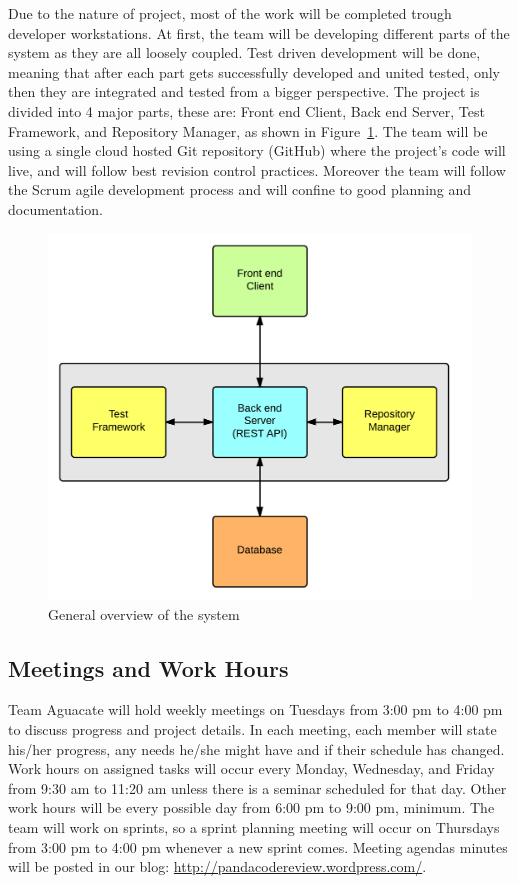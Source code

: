 
Due to the nature of project, most of the work will be completed trough
developer workstations. At first, the team will be developing different parts of
the system as they are all loosely coupled. Test driven development will be
done, meaning that after each part gets successfully developed and united
tested, only then they are integrated and tested from a bigger perspective. The
project is divided into 4 major parts, these are: Front end Client, Back end
Server, Test Framework, and Repository Manager, as shown in Figure~\ref{arqu}.
The team will be using a single
cloud hosted Git repository (GitHub) where the project's code will live, and
will follow best revision control practices. Moreover the team will follow the
Scrum agile development process and will confine to good planning and
documentation.

\begin{figure}[H]
	\centering
	\includegraphics[width=\textwidth]{img/bigArquitectOverview}
	\caption{General overview of the system\label{arqu}}
\end{figure}

\subsection{Meetings and Work Hours}

Team Aguacate will hold weekly meetings on Tuesdays from 3:00 pm to 4:00 pm to
discuss progress and project details. In each meeting, each member will state
his/her progress, any needs he/she might have and if their schedule has changed.
Work hours on assigned tasks will occur every Monday, Wednesday, and Friday from
9:30 am to 11:20 am unless there is a seminar scheduled for that day. Other work
hours will be every possible day from 6:00 pm to 9:00 pm, minimum. The team will
work on sprints, so a sprint planning meeting will occur on Thursdays from 3:00
pm to 4:00 pm whenever a new sprint comes. Meeting agendas minutes will be
posted in our blog: \url{http://pandacodereview.wordpress.com/}.

